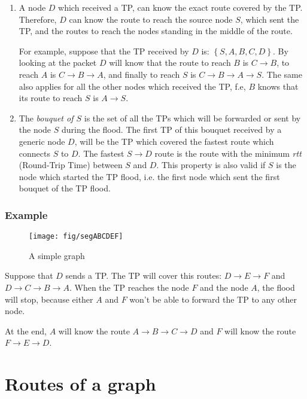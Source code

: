 \documentclass[a4paper]{article}
\begin{document}
\begin{enumerate}
	\item A node $D$ which received a TP, can know the exact route covered
		by the TP. Therefore, $D$ can know the route to reach the
		source node $S$, which sent the TP, and the routes to reach
		the nodes standing in the middle of the route.
		
		For example, suppose that the TP received by $D$ is: $\left\{
		S, A, B, C, D \right\}$. By looking at the packet $D$ will
		know that the route to reach $B$ is $C\rightarrow B$, to reach $A$ is
		$C\rightarrow B\rightarrow A$, and finally to reach $S$ is
		$C\rightarrow B\rightarrow A\rightarrow S$.
		The same also applies for all the other nodes which received
		the TP, f.e, $B$ knows that its route to reach $S$ is
		$A\rightarrow S$.
	\item The \emph{bouquet of $S$} is the set of all the TPs which will
		be forwarded or sent by the node $S$ during the flood.
		The first TP of this bouquet received by a generic node $D$,
		will be the TP which covered the fastest route which connects
		$S$ to $D$.
		The fastest $S \rightarrow D$ route is the route with the
		minimum \emph{rtt} (Round-Trip Time) between $S$ and $D$.
		This property is also valid if $S$ is the node which started
		the TP flood, i.e. the first node which sent the first bouquet
		of the TP flood.
\end{enumerate}


\subsubsection*{Example}
\begin{figure}[h]
	\begin{center}
		\texttt{[image: fig/segABCDEF]}
	\end{center}
	\caption{A simple graph}
\end{figure}

Suppose that $D$ sends a TP. The TP will cover this routes:
$D \rightarrow E \rightarrow F$ and $D \rightarrow C \rightarrow B \rightarrow A$.
When the TP reaches the node $F$ and the node $A$, the flood will stop,
because either $A$ and $F$ won't be able to forward the TP to any other node.

At the end, $A$ will know the route $A \rightarrow B \rightarrow C \rightarrow D$ and $F$ will know the
route $F \rightarrow E \rightarrow D$.

\section{Routes of a graph}
\label{sec:gen_routes}
\end{document}
